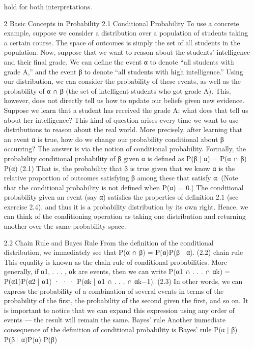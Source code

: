 hold for both interpretations.

2 Basic Concepts in Probability
2.1 Conditional Probability
To use a concrete example, suppose we consider a distribution over a population of students taking a certain course. The space of outcomes is simply the set of all students in the population. Now, suppose that we want to reason about the students’ intelligence and their final grade. We can define the event α to denote “all students with grade A,” and the event β to denote “all students with high intelligence.” Using our distribution, we can consider the probability of these events, as well as the probability of α ∩ β (the set of intelligent students who got grade A). This, however, does not directly tell us how to update our beliefs given new evidence. Suppose we learn that a student has received the grade A; what does that tell us about her intelligence? This kind of question arises every time we want to use distributions to reason about the real world. More precisely, after learning that an event α is true, how do we change our probability conditional about β occurring? The answer is via the notion of conditional probability. Formally, the probability conditional probability of β given α is defined as P(β | α) = P(α ∩ β) P(α) (2.1) That is, the probability that β is true given that we know α is the relative proportion of outcomes satisfying β among these that satisfy α. (Note that the conditional probability is not defined when P(α) = 0.) The conditional probability given an event (say α) satisfies the properties of definition 2.1 (see exercise 2.4), and thus it is a probability distribution by its own right. Hence, we can think of the conditioning operation as taking one distribution and returning another over the same probability space.

2.2 Chain Rule and Bayes Rule
From the definition of the conditional distribution, we immediately see that P(α ∩ β) = P(α)P(β | α). (2.2) chain rule This equality is known as the chain rule of conditional probabilities. More generally, if α1, . . . , αk are events, then we can write P(α1 ∩ . . . ∩ αk) = P(α1)P(α2 | α1) · · · P(αk | α1 ∩ . . . ∩ αk−1). (2.3) In other words, we can express the probability of a combination of several events in terms of the probability of the first, the probability of the second given the first, and so on. It is important to notice that we can expand this expression using any order of events — the result will remain the same. Bayes’ rule Another immediate consequence of the definition of conditional probability is Bayes’ rule P(α | β) = P(β | α)P(α) P(β)


